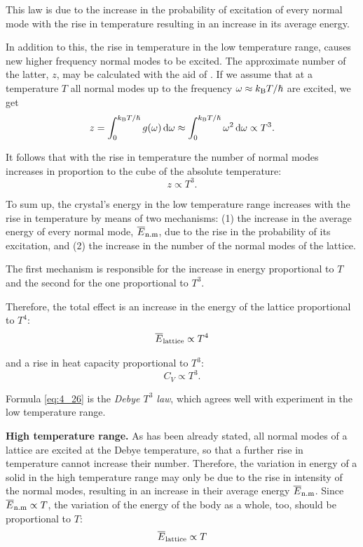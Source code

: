 \noindent
This law is due to the increase in the probability of excitation of every normal mode with the rise in temperature resulting in an increase in its average energy.

In addition to this, the rise in temperature in the low temperature range, causes new higher frequency normal modes to be excited. The approximate number of the latter, $z$, may be calculated with the aid of . If we assume that at a temperature $T$ all normal modes up to the frequency $\omega\approx k_{\text{B}}T/\hslash$ are excited, we get
\begin{equation*}
    z = \int_0^{k_{\text{B}}T/\hslash} g(\omega)\, \mathrm{d}\omega \approx \int_0^{k_{\text{B}}T/\hslash} \omega^2\, \mathrm{d}\omega \propto T^3.
\end{equation*}

It follows that with the rise in temperature the number of normal modes increases in proportion to the cube of the absolute temperature:
\begin{equation}\label{eq:4_24}
    z \propto T^3.
\end{equation}

To sum up, the crystal's energy in the low temperature range increases with the rise in temperature by means of two mechanisms: (1) the increase in the average energy of every normal mode, $\overline{E}_{\text{n.m}}$, due to the rise in the probability of its excitation, and (2) the increase in the number of the normal modes of the lattice.

The first mechanism is responsible for the increase in energy proportional to $T$ and the second for the one proportional to $T^3$.

Therefore, the total effect is an increase in the energy of the lattice proportional to $T^4$:
\begin{equation}\label{eq:4_25}
    \overline{E}_{\text{lattice}} \propto T^4
\end{equation}

\noindent
and a rise in heat capacity proportional to $T^3$:
\begin{equation}\label{eq:4_26}
    C_V \propto T^3.
\end{equation}

Formula \eqref{eq:4_26} is the \textit{Debye $T^3$ law}, which agrees well with experiment in the low temperature range.

\textbf{High temperature range.} As has been already stated, all normal modes of a lattice are excited at the Debye temperature, so that a further rise in temperature cannot increase their number. Therefore, the variation in energy of a solid in the high temperature range may only be due to the rise in intensity of the normal modes, resulting in an increase in their average energy $\overline{E}_{\text{n.m}}$. Since $\overline{E}_{\text{n.m}}\propto T$, the variation of the energy of the body as a whole, too, should be proportional to $T$:
\begin{equation}\label{eq:4_27}
    \overline{E}_{\text{lattice}} \propto T
\end{equation}

